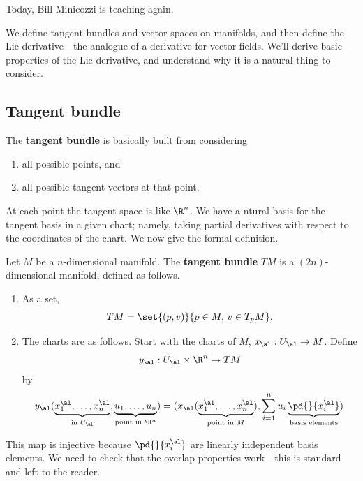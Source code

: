 
Today, Bill Minicozzi is teaching again.

We define tangent bundles and vector spaces on manifolds, and then define the Lie derivative---the analogue of a derivative for vector fields. We'll derive basic properties of the Lie derivative, and understand why it is a natural thing to consider.

\subsection{Tangent bundle}

%
%

The \textbf{tangent bundle} is basically built from considering 
\begin{enumerate}
\item
all possible points, and
\item
all possible tangent vectors at that point.
\end{enumerate}
At each point the tangent space is like $\R^n$. We have a ntural basis for the tangent basis in a given chart; namely, taking partial derivatives with respect to the coordinates of the chart. We now give the formal definition.

\begin{df}
Let $M$ be a $n$-dimensional manifold. The \textbf{tangent bundle} $TM$ is a $(2n)$-dimensional manifold, defined as follows.
\begin{enumerate}
\item
As a set,
\[
TM=\set{(p,v)}{p\in M,\,v\in T_pM}.
\]
\item The charts are as follows. Start with the charts of $M$,  $x_{\al}:U_{\al}\to M$. Define
\[
y_{\al}:U_{\al}\times \R^n\to TM
\]
by
\[
y_{\al}(\underbrace{x_1^{\al},\ldots,x_n^{\al}}_{\text{in }U_{\al}},\underbrace{u_1,\ldots, u_n}_{\text{point in }\R^n})=
(x_{\al}(\underbrace{x_1^{\al},\ldots, x_n^{\al}}_{\text{point in }M}),\sum_{i=1}^n u_i\underbrace{\pd{}{x_i^{\al}}}_{\text{basis elements}})
\]
\end{enumerate}
\end{df}
This map is injective because $\pd{}{x_i^{\al}}$ are linearly independent basis elements. We need to check that the overlap properties work---this is standard and left to the reader.

